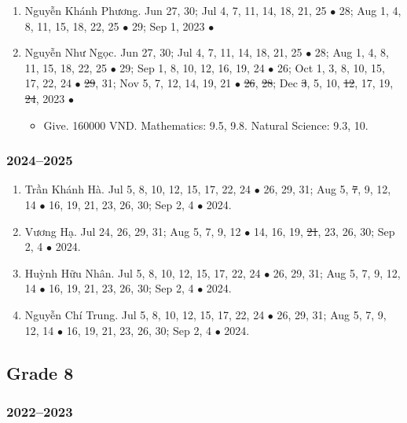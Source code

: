 \documentclass{article}
\begin{document}
\begin{enumerate}
\begin{itemize}
	\end{itemize}
	\item {\sc Nguyễn Khánh Phương.} {\sf[In]} Jun 27, 30; Jul 4, 7, 11, 14, 18, 21, 25 $\bullet$ 28; Aug 1, 4, 8, 11, 15, 18, 22, 25 $\bullet$ 29; Sep 1, 2023 $\bullet$ \sf{[Out]}
	\item {\sc Nguyễn Như Ngọc.} {\sf[In]} Jun 27, 30; Jul 4, 7, 11, 14, 18, 21, 25 $\bullet$ 28; Aug 1, 4, 8, 11, 15, 18, 22, 25 $\bullet$ 29; Sep 1, 8, 10, 12, 16, 19, 24 $\bullet$ 26; Oct 1, 3, 8, 10, 15, 17, 22, 24 $\bullet$ \st{29}, 31; Nov 5, 7, 12, 14, 19, 21 $\bullet$ \st{26}, \st{28}; Dec \st{3}, 5, 10, \st{12}, 17, 19, \st{24}, 2023 $\bullet$ {\sf[Out]}
	\begin{itemize}
		\item {\sf Give.} 160000 VND. Mathematics: 9.5, 9.8. Natural Science: 9.3, 10.
	\end{itemize}
\end{enumerate}

\subsubsection{2024--2025}

\begin{enumerate}
	\item {\sc Trần Khánh Hà.} Jul 5, 8, 10, 12, 15, 17, 22, 24 $\bullet$ 26, 29, 31; Aug 5, \st{7}, 9, 12, 14 $\bullet$ 16, 19, 21, 23, 26, 30; Sep 2, 4 $\bullet$ 2024.
	\item {\sc Vương Hạ.} Jul 24, 26, 29, 31; Aug 5, 7, 9, 12 $\bullet$ 14, 16, 19, \st{21}, 23, 26, 30; Sep 2, 4 $\bullet$ 2024.
	\item {\sc Huỳnh Hữu Nhân.} Jul 5, 8, 10, 12, 15, 17, 22, 24 $\bullet$ 26, 29, 31; Aug 5, 7, 9, 12, 14 $\bullet$ 16, 19, 21, 23, 26, 30; Sep 2, 4 $\bullet$ 2024.
	\item {\sc Nguyễn Chí Trung.} Jul 5, 8, 10, 12, 15, 17, 22, 24 $\bullet$ 26, 29, 31; Aug 5, 7, 9, 12, 14 $\bullet$ 16, 19, 21, 23, 26, 30; Sep 2, 4 $\bullet$ 2024.
\end{enumerate}


\subsection{Grade 8}

\subsubsection{2022--2023}
\end{document}
